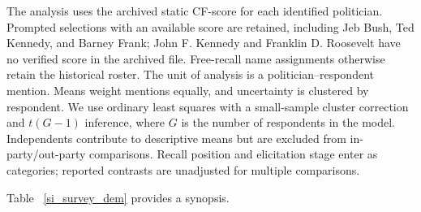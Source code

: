 \documentclass[12pt, letterpaper]{article}
\begin{document}
The analysis uses the archived static CF-score for each identified politician. Prompted selections with an available score are retained, including Jeb Bush, Ted Kennedy, and Barney Frank; John F. Kennedy and Franklin D. Roosevelt have no verified score in the archived file. Free-recall name assignments otherwise retain the historical roster. The unit of analysis is a politician--respondent mention. Means weight mentions equally, and uncertainty is clustered by respondent. We use ordinary least squares with a small-sample cluster correction and $t(G-1)$ inference, where $G$ is the number of respondents in the model. Independents contribute to descriptive means but are excluded from in-party/out-party comparisons. Recall position and elicitation stage enter as categories; reported contrasts are unadjusted for multiple comparisons.

Table ~\ref{si_survey_dem} provides a synopsis.
\end{document}
